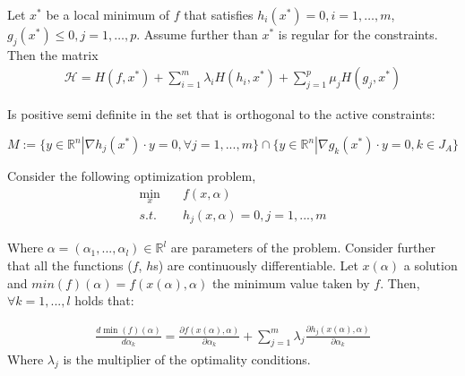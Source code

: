 \documentclass[aspectratio=169]{beamer}
\begin{document}
\begin{frame}
    \begin{theorem}
        Let $x^*$ be a local minimum of $f$ that satisfies $h_i(x^*)=0,i=1,\ldots,m$, $g_j(x^*)\leq0,j=1,\dots,p$. Assume further than $x^*$ is regular for the constraints. Then the matrix
        \begin{align*}
        \mathcal{H}=H(f,x^*)+\sum_{i=1}^m \lambda_i H(h_i,x^*)+\sum_{j=1}^p \mu_j H(g_j,x^*)
        \end{align*}
        
        Is positive semi definite in the set that is orthogonal to the active constraints:
        
        $M:=\{y\in\mathds{R}^n|\nabla h_j(x^*)\cdot y=0,\forall j=1,...,m\}\cap\{y\in\mathds{R}^n|\nabla g_k(x^*)\cdot y=0, k\in J_A\}$
        
    \end{theorem}
\end{frame}

\begin{frame}
    \begin{theorem}
        Consider the following optimization problem,
        \begin{align*}
            \min_x \quad &f(x,\alpha)\\
            s.t.\quad &h_j(x,\alpha)=0, j=1,...,m
        \end{align*}
        
        Where $\alpha=(\alpha_1,...,\alpha_l)\in\mathds{R}^l$ are parameters of the problem. Consider further that all the functions ($f$, $h$s) are continuously differentiable. Let $x(\alpha)$ a solution and $min(f)(\alpha)=f(x(\alpha),\alpha)$ the minimum value taken by $f$. Then, $\forall k=1,...,l$ holds that:
        
        \begin{align*}
            \frac{d \min(f)(\alpha)}{d \alpha_k}=\frac{\partial f(x(\alpha),\alpha)}{\partial \alpha_k}+\sum_{j=1}^m\lambda_j\frac{\partial h_j(x(\alpha),\alpha)}{\partial \alpha_k}
        \end{align*}
        Where $\lambda_j$ is the multiplier of the optimality conditions.
    \end{theorem}
\end{frame}
\end{document}
